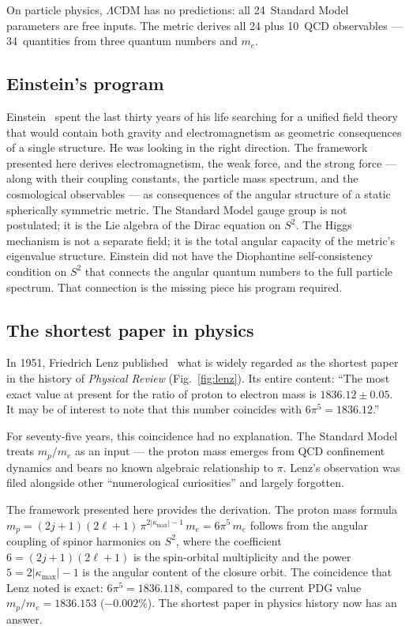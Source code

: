 \documentclass[aps,prd,twocolumn,superscriptaddress,nofootinbib,longbibliography]{revtex4-2}
\begin{document}
On particle physics, $\Lambda$CDM has no predictions: all 24~Standard
Model parameters are free inputs.  The metric derives all 24 plus
10~QCD observables --- 34~quantities from three quantum numbers and
$m_e$.

\subsection{Einstein's program}

Einstein~\cite{Einstein1916} spent the last thirty years of his life
searching for a unified field theory that would contain both gravity
and electromagnetism as geometric consequences of a single structure.  He
was looking in the right direction.  The framework presented here
derives electromagnetism, the weak force, and the strong force ---
along with their coupling constants, the particle mass spectrum, and
the cosmological observables --- as consequences of the angular
structure of a static spherically symmetric metric.  The Standard
Model gauge group is not postulated; it is the Lie algebra of the
Dirac equation on $S^2$.  The Higgs mechanism is not a separate
field; it is the total angular capacity of the metric's eigenvalue
structure.  Einstein did not have the Diophantine self-consistency
condition on $S^2$ that connects the angular quantum numbers to the
full particle spectrum.  That connection is the missing piece his
program required.

\subsection{The shortest paper in physics}

In 1951, Friedrich Lenz published~\cite{Lenz1951} what is widely regarded as the
shortest paper in the history of \textit{Physical Review}
(Fig.~\ref{fig:lenz}).  Its entire content: ``The most exact value at
present for the ratio of proton to electron mass is
$1836.12 \pm 0.05$.  It may be of interest to note that this number
coincides with $6\pi^5 = 1836.12$.''

For seventy-five years, this coincidence had no explanation.  The
Standard Model treats $m_p/m_e$ as an input --- the proton mass
emerges from QCD confinement dynamics and bears no known algebraic
relationship to $\pi$.  Lenz's observation was filed alongside other
``numerological curiosities'' and largely forgotten.

The framework presented here provides the derivation.  The
proton mass formula
$m_p = (2j+1)(2\ell+1)\,\pi^{2|\kappa_\mathrm{max}|-1}\,m_e
= 6\pi^5\,m_e$ follows from the angular coupling of spinor harmonics
on $S^2$, where the coefficient $6 = (2j+1)(2\ell+1)$ is the
spin-orbital multiplicity and the power $5 = 2|\kappa_\mathrm{max}|-1$
is the angular content of the closure orbit.  The coincidence that
Lenz noted is exact: $6\pi^5 = 1836.118$, compared to the current
PDG value $m_p/m_e = 1836.153$ ($-0.002\%$).  The shortest paper in
physics history now has an answer.
\end{document}
